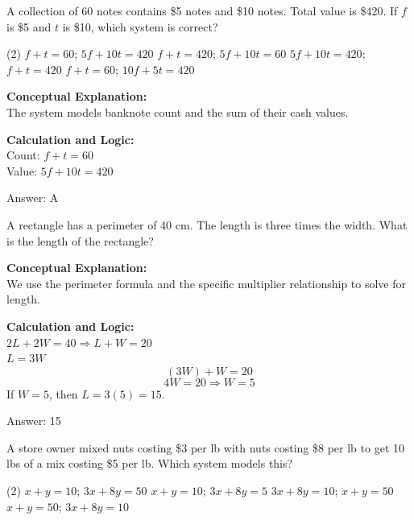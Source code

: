 \documentclass[11pt,paper=a4,answers]{exam}
\begin{document}
\begin{questions}
\question
A collection of 60 notes contains \$5 notes and \$10 notes. Total value is \$420. If $f$ is \$5 and $t$ is \$10, which system is correct?
\begin{tasks}(2)
    \task $f + t = 60$; $5f + 10t = 420$
    \task $f + t = 420$; $5f + 10t = 60$
    \task $5f + 10t = 420$; $f + t = 420$
    \task $f + t = 60$; $10f + 5t = 420$
\end{tasks}

\begin{solution}
\textbf{Conceptual Explanation:} \\
The system models banknote count and the sum of their cash values.

\vspace{10pt}
\textbf{Calculation and Logic:} \\
Count: $f + t = 60$ \\
Value: $5f + 10t = 420$

\vspace{15pt}
Answer: \colorbox{yellow!100}{A}
\end{solution}

\question
A rectangle has a perimeter of 40 cm. The length is three times the width. What is the length of the rectangle?

\begin{solution}
\textbf{Conceptual Explanation:} \\
We use the perimeter formula and the specific multiplier relationship to solve for length.

\vspace{10pt}
\textbf{Calculation and Logic:} \\
$2L + 2W = 40 \Rightarrow L + W = 20$ \\
$L = 3W$ \\
\[(3W) + W = 20\]
\[4W = 20 \Rightarrow W = 5\]
If $W = 5$, then $L = 3(5) = 15$.

\vspace{15pt}
Answer: \colorbox{yellow!100}{15}
\end{solution}

\question
A store owner mixed nuts costing \$3 per lb with nuts costing \$8 per lb to get 10 lbs of a mix costing \$5 per lb. Which system models this?
\begin{tasks}(2)
    \task $x + y = 10$; $3x + 8y = 50$
    \task $x + y = 10$; $3x + 8y = 5$
    \task $3x + 8y = 10$; $x + y = 50$
    \task $x + y = 50$; $3x + 8y = 10$
\end{tasks}


\end{questions}
\end{document}
